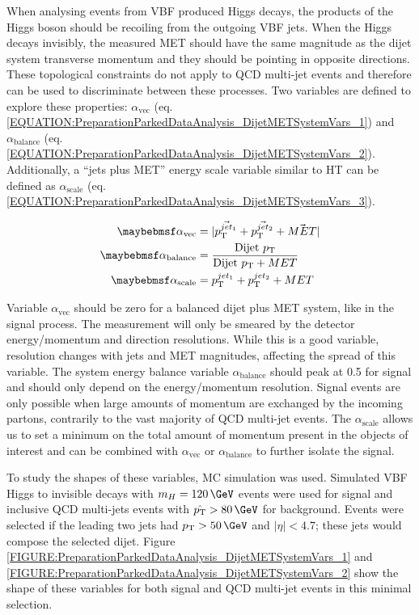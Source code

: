 When analysing events from \gls{VBF} produced Higgs decays, the products of the Higgs boson should be recoiling from the outgoing \gls{VBF} jets. When the Higgs decays invisibly, the measured \gls{MET} should have the same magnitude as the dijet system transverse momentum and they should be pointing in opposite directions. These topological constraints do not apply to \gls{QCD} multi-jet events and therefore can be used to discriminate between these processes. Two variables are defined to explore these properties: $\alpha_{\text{vec}}$ (eq. \ref{EQUATION:PreparationParkedDataAnalysis_DijetMETSystemVars_1}) and $\alpha_{\text{balance}}$ (eq. \ref{EQUATION:PreparationParkedDataAnalysis_DijetMETSystemVars_2}). Additionally, a ``jets plus \gls{MET}'' energy scale variable similar to \gls{HT} can be defined as $\alpha_{\text{scale}}$ (eq. \ref{EQUATION:PreparationParkedDataAnalysis_DijetMETSystemVars_3}).

\begin{align}
\alpha_{\text{vec}}     &= |\vec{\pt^{jet_1}} + \vec{\pt^{jet_2}} + \vec{MET}|
\label{EQUATION:PreparationParkedDataAnalysis_DijetMETSystemVars_1} \\
\alpha_{\text{balance}} &= \frac{\text{Dijet } \pt}{\text{Dijet } \pt + MET} 
\label{EQUATION:PreparationParkedDataAnalysis_DijetMETSystemVars_2} \\
\alpha_{\text{scale}}   &= \pt^{jet_1} + \pt^{jet_2} + MET 
\label{EQUATION:PreparationParkedDataAnalysis_DijetMETSystemVars_3}
\end{align}

Variable $\alpha_{\text{vec}}$ should be zero for a balanced dijet plus \gls{MET} system, like in the signal process. The measurement will only be smeared by the detector energy/momentum and direction resolutions. While this is a good variable, resolution changes with jets and \gls{MET} magnitudes, affecting the spread of this variable. The system energy balance variable $\alpha_{\text{balance}}$ should peak at 0.5 for signal and should only depend on the energy/momentum resolution. Signal events are only possible when large amounts of momentum are exchanged by the incoming partons, contrarily to the vast majority of \gls{QCD} multi-jet events. The $\alpha_{\text{scale}}$ allows us to set a minimum on the total amount of momentum present in the objects of interest and can be combined with $\alpha_{\text{vec}}$ or $\alpha_{\text{balance}}$ to further isolate the signal.

To study the shapes of these variables, \gls{MC} simulation was used. Simulated \gls{VBF} Higgs to invisible decays with $m_H=120\,\GeV$ events were used for signal and inclusive \gls{QCD} multi-jets events with $\hat{\pt}>80\,\GeV$ for background. Events were selected if the leading two jets had $\pt>50\,\GeV$ and $|\eta|<4.7$; these jets would compose the selected dijet. Figure \ref{FIGURE:PreparationParkedDataAnalysis_DijetMETSystemVars_1} and \ref{FIGURE:PreparationParkedDataAnalysis_DijetMETSystemVars_2} show the shape of these variables for both signal and \gls{QCD} multi-jet events in this minimal selection.

